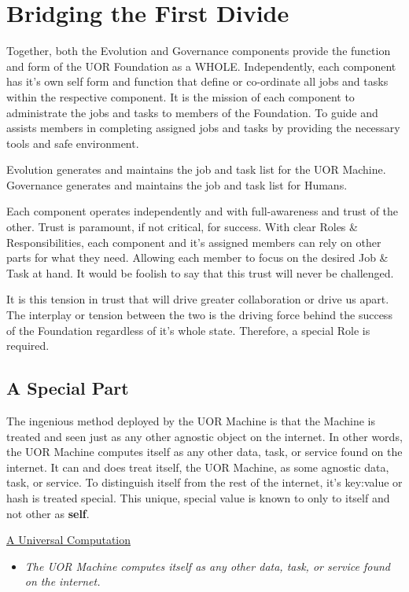 \documentclass[twocolumn,10pt]{article}
\begin{document}
\section*{Bridging the First Divide}
Together, both the Evolution and Governance components provide the function and form of the UOR Foundation as a WHOLE\@.
Independently, each component has it's own self form and function that define or co-ordinate all jobs and tasks within the respective component.
It is the mission of each component to administrate the jobs and tasks to members of the Foundation.
To guide and assists members in completing assigned jobs and tasks by providing the necessary tools and safe environment.

Evolution generates and maintains the job and task list for the UOR Machine.
Governance generates and maintains the job and task list for Humans.

Each component operates independently and with full-awareness and trust of the other.
Trust is paramount, if not critical, for success.
With clear Roles \& Responsibilities, each component and it's assigned members can rely on other parts for what they need.
Allowing each member to focus on the desired Job \& Task at hand.
It would be foolish to say that this trust will never be challenged.

It is this tension in trust that will drive greater collaboration or drive us apart.
The interplay or tension between the two is the driving force behind the success of the Foundation regardless of it's whole state.
Therefore, a special Role is required.

\subsection*{A Special Part}
The ingenious method deployed by the UOR Machine is that the Machine is treated and seen just as any other agnostic object on the internet.
In other words, the UOR Machine computes itself as any other data, task, or service found on the internet.
It can and does treat itself, the UOR Machine, as some agnostic data, task, or service.
To distinguish itself from the rest of the internet, it's key:value or hash is treated special.
This unique, special value is known to only to itself and not other as \textbf{self}.

\vspace{20pt}
\begin{minipage}{0.95\linewidth}
    \begin{tcolorbox}
        \begin{center}\underline{A Universal Computation}\end{center}
        \begin{itemize}
            \item \textit{The UOR Machine computes itself as any other data, task, or service found on the internet.}
        \end{itemize}
    \end{tcolorbox}
\end{minipage}
\vspace{10pt}
\end{document}
